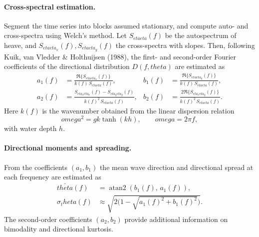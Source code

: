 \documentclass[journal,10pt,twocolumn]{IEEEtran}
\def\omega{omega}%
\def\eta{eta}%
\def\theta{theta}%
\begin{document}
    \paragraph{Cross-spectral estimation.}
    Segment the time series into blocks assumed stationary, and compute auto- and cross-spectra using Welch's method. Let $S_{\eta\eta}(f)$ be the autospectrum of heave, and $S_{\eta\eta_x}(f), S_{\eta\eta_y}(f)$ the cross-spectra with slopes. Then, following Kuik, van Vledder \& Holthuijsen (1988), the first- and second-order Fourier coefficients of the directional distribution $D(f,\theta)$ are estimated as
    \begin{align}
        a_1(f) &= \frac{\Re\{S_{\eta\eta_x}(f)\}}{k(f)\,S_{\eta\eta}(f)},
        &
        b_1(f) &= \frac{\Re\{S_{\eta\eta_y}(f)\}}{k(f)\,S_{\eta\eta}(f)},\\
        a_2(f) &= \frac{S_{\eta_x\eta_x}(f)-S_{\eta_y\eta_y}(f)}{k(f)^2\,S_{\eta\eta}(f)},
        &
        b_2(f) &= \frac{2\Re\{S_{\eta_x\eta_y}(f)\}}{k(f)^2\,S_{\eta\eta}(f)}.
    \end{align}
    Here $k(f)$ is the wavenumber obtained from the linear dispersion relation
    \begin{equation}
        \omega^2 = gk \tanh(kh), \qquad \omega=2\pi f,
    \end{equation}
    with water depth $h$.

    \paragraph{Directional moments and spreading.}
    From the coefficients $(a_1,b_1)$ the mean wave direction and directional spread at each frequency are estimated as
    \begin{align}
        \bar{\theta}(f) &= \operatorname{atan2}(b_1(f),\,a_1(f)),\\
        \sigma_\theta(f) &\approx \sqrt{2\Big(1 - \sqrt{a_1(f)^2 + b_1(f)^2}\Big)}.
    \end{align}
    The second-order coefficients $(a_2,b_2)$ provide additional information on bimodality and directional kurtosis.
\end{document}
